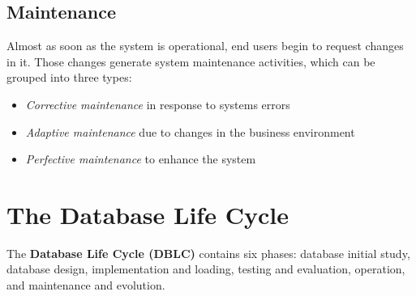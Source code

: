 \documentclass[a4paper, 12pt, titlepage]{report}
\begin{document}
\subsection{Maintenance}
Almost as soon as the system is operational, end users begin to request changes in it. Those changes generate system maintenance activities, which can be grouped into three types:
\begin{itemize}
\item \emph{Corrective maintenance} in response to systems errors
\item \emph{Adaptive maintenance} due to changes in the business environment
\item \emph{Perfective maintenance} to enhance the system
\end{itemize}
\section{The Database Life Cycle}
The \textbf{Database Life Cycle (DBLC)} contains six phases: database initial study, database design, implementation and loading, testing and evaluation, operation, and maintenance and evolution.
\end{document}
